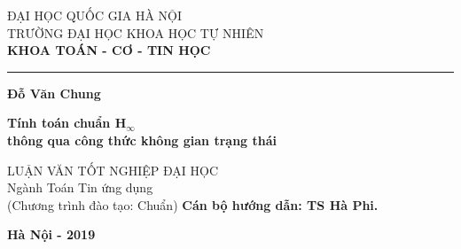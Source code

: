\begin{titlepage}


\begin{center}
	{\fontsize{14pt}{15.6}\selectfont
		ĐẠI HỌC QUỐC GIA HÀ NỘI \\
		TRƯỜNG ĐẠI HỌC KHOA HỌC TỰ NHIÊN\\}
	\medspace
	{\fontsize{13pt}{15.6}\selectfont
		\textbf{KHOA TOÁN - CƠ - TIN HỌC}}
	
	\rule{7.25cm}{1pt}
	
	\vfill
	{\fontsize{14}{15.6}\selectfont \textbf{Đỗ Văn Chung}}
	\vfill
	
	{\fontsize{18}{20}\selectfont \textbf{Tính toán chuẩn H$_\infty$ \\ thông qua công thức không gian trạng thái}}
	\vfill
	
	{\fontsize{14}{15.6}\selectfont 
		LUẬN VĂN TỐT NGHIỆP ĐẠI HỌC\\
		\vspace{1cm}
		Ngành Toán Tin ứng dụng\\
		(Chương trình đào tạo: Chuẩn)
	}
	\vfill
	{\fontsize{14}{15.6}\selectfont \textbf{Cán bộ hướng dẫn: TS Hà Phi.}}
	
	\vfill
	{\fontsize{14}{15.6}\selectfont \textbf{Hà Nội - 2019}}
\end{center}
\end{titlepage}